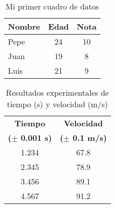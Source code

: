 
 \begin{table}[!ht]
 \begin{center}
 \begin{tabular}{|l|c|c|}
 \hline
 Nombre & Edad & Nota \\ \hline
 Pepe & 24 & 10 \\ \hline
 Juan & 19 & 8 \\ \hline
 Luis & 21 & 9 \\ \hline
 \end{tabular}
 \end{center}
 \caption{Mi primer cuadro de datos}
 \label{tab}
 \end{table}



\begin{table}[!ht]
\begin{center}
\begin{tabular}{|c|c|} \hline 
\textbf{Tiempo  } & \textbf{Velocidad} \\ 
\textbf{($\pm$ 0.001 s)} & \textbf{($\pm$ 0.1 m/s)} \\ \hline \hline
1.234 &
67.8
\\
\hline

2.345 &
78.9
\\
\hline

3.456 &
89.1
\\
\hline

4.567 &
91.2
\\
\hline

\end{tabular}
\end{center}
\caption{Resultados experimentales de tiempo (s) y velocidad (m/s)}
\label{tab:1}
\end{table}

